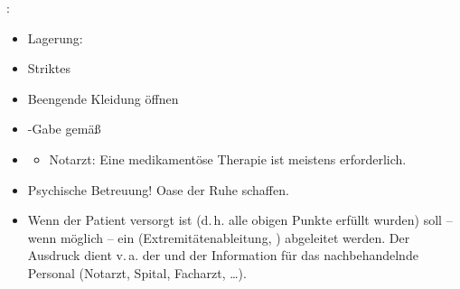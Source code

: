 
\label{m:tachykarde-attacke}
: 
\begin{itemize}
    \item Lagerung: 
  \item Striktes 
  \item Beengende Kleidung öffnen
    \item {}-Gabe gemäß 
  \item \TxBeiVit \TxMassVitMKBes
  \begin{itemize}
    \item Notarzt: Eine medikamentöse Therapie ist meistens
    erforderlich.
  \end{itemize}
  \item Psychische Betreuung! Oase der Ruhe schaffen.
  \item Wenn der Patient versorgt ist (d.\,h. alle obigen Punkte erfüllt
  wurden) soll -- wenn möglich -- ein 
  (Extremitätenableitung, ) abgeleitet werden. Der
  Ausdruck dient v.\,a. der  und der Information für das
  nachbehandelnde Personal (Notarzt, Spital, Facharzt, \ldots).
\end{itemize}